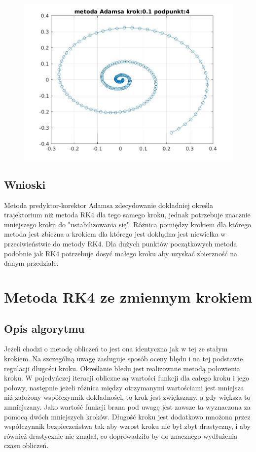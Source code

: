 \documentclass[a4paper, 12pt]{article}
\begin{document}
\begin{figure}[H]
\centering
\includegraphics[width = 15cm]{2d/metoda Adamsa krok:0,1 podpunkt:4.jpg}
\end{figure}

\subsection{Wnioski}
Metoda predyktor-korektor Adamsa zdecydowanie dokładniej określa trajektorium niż metoda RK4 dla tego samego kroku, jednak potrzebuje znacznie mniejszego kroku do "ustabilizowania się". Różnica pomiędzy krokiem dla którego metoda jest zbieżna a krokiem dla którego jest dokłądna jest niewielka w przeciwieństwie do metody RK4. Dla dużych punktów początkowych metoda podobnie jak RK4 potrzebuje dosyć małego kroku aby uzyskać zbierzność na danym przedziale. 

\section{Metoda RK4 ze zmiennym krokiem}
\subsection{Opis algorytmu}
Jeżeli chodzi o metodę obliczeń to jest ona identyczna jak w tej ze stałym krokiem. Na szczególną uwagę zasługuje sposób oceny błędu i na tej podstawie regulacji długości kroku. Określanie błedu jest realizowane metodą połowienia kroku. W pojedyńczej iteracji obliczne są wartości funkcji dla całego kroku i jego połowy, następnie jeżeli różnica między otrzymanymi wartościami jest mniejsza niż założony współczynnik dokładności, to krok jest zwiększany, a gdy większa to zmniejszany. Jako wartość funkcji brana pod uwagę jest zawsze ta wyznaczona za pomocą dwóch mniejszych kroków. Długość kroku jest dodatkowo mnożona przez współczynnik bezpieczeństwa tak aby wzrost kroku nie był zbyt drastyczny, i aby również drastycznie nie zmalał, co doprowadziło by do znacznego wydłużenia czasu obliczeń. 
\end{document}
